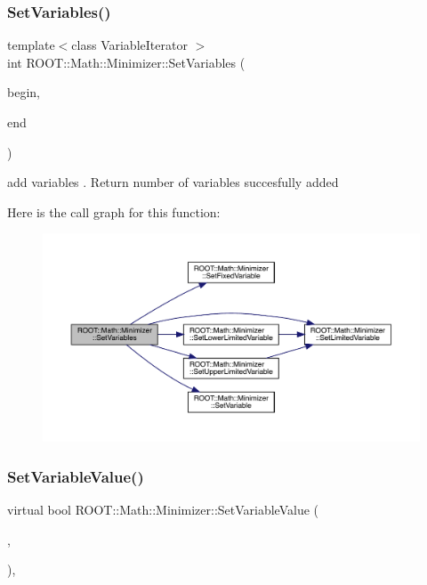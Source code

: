 \subsubsection{\texorpdfstring{SetVariables()}{SetVariables()}\hspace{0.1cm}{\footnotesize\ttfamily [2/2]}}
{\footnotesize\ttfamily template$<$class Variable\+Iterator $>$ \\
int R\+O\+O\+T\+::\+Math\+::\+Minimizer\+::\+Set\+Variables (\begin{DoxyParamCaption}\item[{const Variable\+Iterator \&}]{begin,  }\item[{const Variable\+Iterator \&}]{end }\end{DoxyParamCaption})\hspace{0.3cm}{\ttfamily [inline]}}



add variables . Return number of variables succesfully added 

Here is the call graph for this function\+:
\nopagebreak
\begin{figure}[H]
\begin{center}
\leavevmode
\includegraphics[width=350pt]{dc/dc4/classROOT_1_1Math_1_1Minimizer_a314040274ee907fba52726275a28c9f7_cgraph}
\end{center}
\end{figure}
\mbox{\label{classROOT_1_1Math_1_1Minimizer_a47e9a16c7a0b4ecfe769ee4be048d5c3}} 
\subsubsection{\texorpdfstring{SetVariableValue()}{SetVariableValue()}\hspace{0.1cm}{\footnotesize\ttfamily [1/2]}}
{\footnotesize\ttfamily virtual bool R\+O\+O\+T\+::\+Math\+::\+Minimizer\+::\+Set\+Variable\+Value (\begin{DoxyParamCaption}\item[{unsigned int}]{,  }\item[{double}]{ }\end{DoxyParamCaption})\hspace{0.3cm}{\ttfamily [inline]}, {\ttfamily [virtual]}}




